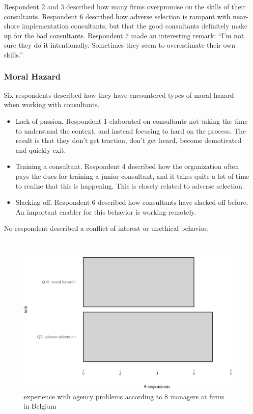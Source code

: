 \documentclass[
  man,floatsintext]{apa6}
\providecommand{\tightlist}{%
  \setlength{\itemsep}{0pt}\setlength{\parskip}{0pt}}
\begin{document}
Respondent 2 and 3 described how many firms overpromise on the skills of their consultants. Respondent 6 described how adverse selection is rampant with near-shore implementation consultants, but that the good consultants definitely make up for the bad consultants. Respondent 7 made an interesting remark: ``I'm not sure they do it intentionally. Sometimes they seem to overestimate their own skills.''

\subsubsection{Moral Hazard}\label{moral-hazard}

Six respondents described how they have encountered types of moral hazard when working with consultants.

\begin{itemize}
\tightlist
\item
  Lack of passion. Respondent 1 elaborated on consultants not taking the time to understand the context, and instead focusing to hard on the process. The result is that they don't get traction, don't get heard, become demotivated and quickly exit.
\item
  Training a consultant. Respondent 4 described how the organization often pays the dues for training a junior consultant, and it takes quite a lot of time to realize that this is happening. This is closely related to adverse selection.
\item
  Slacking off. Respondent 6 described how consultants have slacked off before. An important enabler for this behavior is working remotely.
\end{itemize}

No respondent described a conflict of interest or unethical behavior.

\(~\)

\begin{figure}

{\centering \includegraphics[width=0.75\linewidth]{2_ams_five_pager_files/figure-latex/unnamed-chunk-6-1} 

}

\caption{experience with agency problems according to 8 managers at firms in Belgium}\label{fig:unnamed-chunk-6}
\end{figure}
\end{document}
